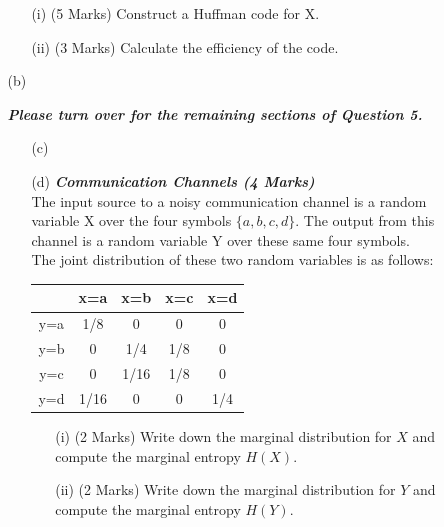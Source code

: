 \documentclass[a4paper,12pt]{article}
\begin{document}
\begin{itemize}
\begin{itemize}
\begin{itemize}
\item[(i)] (5 Marks) Construct a Huffman code for X.
\item[(ii)] (3 Marks) Calculate the efficiency of the code.
\end{itemize}
\bigskip
\item[(b)] 

{
\normalsize
\textit{\textbf{Please turn over for the remaining sections of Question 5.}}
}

\newpage
\begin{itemize}
\item[(c)]


\item[(d)] \textbf{\textit{Communication Channels (4 Marks)}}\\
The input source to a noisy communication channel is a random variable X over the
four symbols $\{a, b, c, d\}$. The output from this channel is a random variable Y over these same
four symbols. \\
\vspace{0.3cm}
\noindent 
The joint distribution of these two random variables is as follows:\\ \bigskip

\begin{center}
\begin{tabular}{|c|c|c|c|c|}
\hline
&x=a& x=b & x=c & x=d \\ \hline
y=a &1/8 &0 &0 & 0 \\ \hline
y=b &0 & 1/4& 1/8& 0 \\ \hline
y=c & 0&1/16 & 1/8 & 0\\ \hline
y=d & 1/16& 0& 0 & 1/4\\ \hline
\end{tabular}
\end{center}

\begin{itemize}
\item[(i)] (2 Marks) Write down the marginal distribution for $X$ and compute the marginal entropy $H(X)$.
\item[(ii)] (2 Marks) Write down the marginal distribution for $Y$ and compute the marginal entropy $H(Y )$.
\end{itemize}


\end{itemize}
\end{itemize}
\end{itemize}
\end{document}
